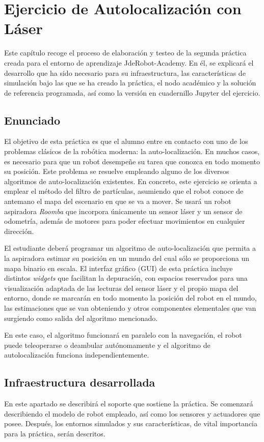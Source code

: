 \chapter{Ejercicio de Autolocalización con Láser}\label{cap.laserloc}
Este capítulo recoge el proceso de elaboración y testeo de la segunda práctica creada para el entorno de aprendizaje JdeRobot-Academy. En él, se explicará el desarrollo que ha sido necesario para su infraestructura, las características de simulación bajo las que se ha creado la práctica, el nodo académico y la solución de referencia programada, así como la versión en cuadernillo Jupyter del ejercicio.

\section{Enunciado} \label{sec.enunciado}
El objetivo de esta práctica es que el alumno entre en contacto con uno de los problemas clásicos de la robótica moderna: la auto-localización. En muchos casos, es necesario para que un robot desempeñe su tarea que conozca en todo momento su posición. Este problema se resuelve empleando alguno de los diversos algoritmos de auto-localización existentes. En concreto, este ejercicio se orienta a emplear el método del filtro de partículas, asumiendo que el robot conoce de antemano el mapa del escenario en que se va a mover. Se usará un robot aspiradora \textit{Roomba} que incorpora únicamente un sensor láser y un sensor de odometría, además de motores para poder efectuar movimientos en cualquier dirección. 

El estudiante deberá programar un algoritmo de auto-localización que permita a la aspiradora estimar su posición en un mundo del cual sólo se proporciona un mapa binario en escala. El interfaz gráfico (GUI) de esta práctica incluye distintos \textit{widgets} que facilitan la depuración, con espacios reservados para una visualización adaptada de las lecturas del sensor láser y el propio mapa del entorno, donde se marcarán en todo momento la posición del robot en el mundo, las estimaciones que se van obteniendo y otros componentes elementales que van surgiendo como salida del algoritmo mencionado. 

En este caso, el algoritmo funcionará en paralelo con la navegación, el robot puede teleoperarse o deambular autónomamente y el algoritmo de autolocalización funciona independientemente.

\section{Infraestructura desarrollada}
En este apartado se describirá el soporte que sostiene la práctica. Se comenzará describiendo el modelo de robot empleado, así como los sensores y actuadores que posee. Después, los entornos simulados y sus características, de vital importancia para la práctica, serán descritos.

